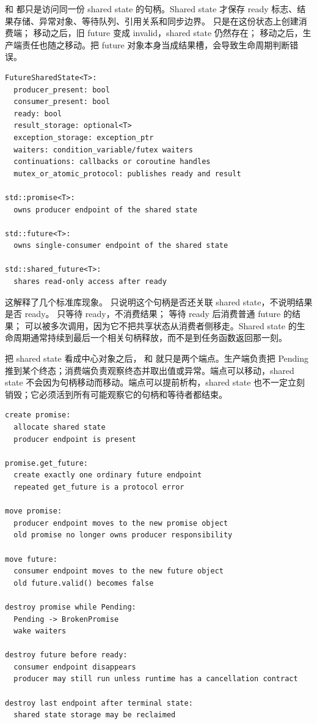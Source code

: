  和  都只是访问同一份 shared state 的句柄。Shared state 才保存 ready 标志、结果存储、异常对象、等待队列、引用关系和同步边界。 只是在这份状态上创建消费端； 移动之后，旧 future 变成 invalid，shared state 仍然存在； 移动之后，生产端责任也随之移动。把 future 对象本身当成结果槽，会导致生命周期判断错误。

\begin{lstlisting}[numbers=none,caption={future shared state 的概念字段}]
FutureSharedState<T>:
  producer_present: bool
  consumer_present: bool
  ready: bool
  result_storage: optional<T>
  exception_storage: exception_ptr
  waiters: condition_variable/futex waiters
  continuations: callbacks or coroutine handles
  mutex_or_atomic_protocol: publishes ready and result

std::promise<T>:
  owns producer endpoint of the shared state

std::future<T>:
  owns single-consumer endpoint of the shared state

std::shared_future<T>:
  shares read-only access after ready
\end{lstlisting}

这解释了几个标准库现象。 只说明这个句柄是否还关联 shared state，不说明结果是否 ready。 只等待 ready，不消费结果； 等待 ready 后消费普通 future 的结果； 可以被多次调用，因为它不把共享状态从消费者侧移走。Shared state 的生命周期通常持续到最后一个相关句柄释放，而不是到任务函数返回那一刻。

把 shared state 看成中心对象之后， 和  就只是两个端点。生产端负责把 Pending 推到某个终态；消费端负责观察终态并取出值或异常。端点可以移动，shared state 不会因为句柄移动而移动。端点可以提前析构，shared state 也不一定立刻销毁；它必须活到所有可能观察它的句柄和等待者都结束。

\begin{lstlisting}[numbers=none,caption={future shared state 的端点生命周期}]
create promise:
  allocate shared state
  producer endpoint is present

promise.get_future:
  create exactly one ordinary future endpoint
  repeated get_future is a protocol error

move promise:
  producer endpoint moves to the new promise object
  old promise no longer owns producer responsibility

move future:
  consumer endpoint moves to the new future object
  old future.valid() becomes false

destroy promise while Pending:
  Pending -> BrokenPromise
  wake waiters

destroy future before ready:
  consumer endpoint disappears
  producer may still run unless runtime has a cancellation contract

destroy last endpoint after terminal state:
  shared state storage may be reclaimed
\end{lstlisting}

